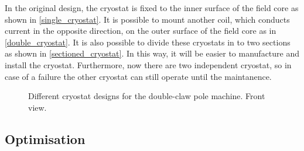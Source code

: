 \documentclass[final,peerreview,onecolumn]{IEEEtran}
\begin{document}
In the original design, the cryostat is fixed to the inner surface of the field core as shown in \autoref{single_cryostat}. It is possible to mount another coil, which conducts current in the opposite direction, on the outer surface of the field core as in \autoref{double_cryostat}. It is also possible to divide these cryostats in to two sections as shown in \autoref{sectioned_cryostat}. In this way, it will be easier to manufacture and install the cryostat. Furthermore, now there are two independent cryostat, so in case of a failure the other cryostat can still operate until the maintanence. 

\begin{figure}[]
  \centering
    \hfill
   \hfill 
    \caption{Different cryostat designs for the double-claw pole machine. Front view.} 
    \label{cryostat_variants}
\end{figure}




\subsection{Optimisation}
\end{document}
